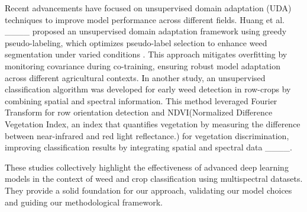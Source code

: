 \textcolor{black}Recent advancements have focused on unsupervised domain adaptation (UDA) techniques to improve model performance across different fields. Huang et al. ____ proposed an unsupervised domain adaptation framework using greedy pseudo-labeling, which optimizes pseudo-label selection to enhance weed segmentation under varied conditions . This approach mitigates overfitting by monitoring covariance during co-training, ensuring robust model adaptation across different agricultural contexts.
\textcolor{black}In another study, an unsupervised classification algorithm was developed for early weed detection in row-crops by combining spatial and spectral information. This method leveraged Fourier Transform for row orientation detection and NDVI(Normalized Difference Vegetation Index, an index that quantifies vegetation by measuring the difference between near-infrared and red light reflectance.) for vegetation discrimination, improving classification results by integrating spatial and spectral data ____.

\textcolor{black}These studies collectively highlight the effectiveness of advanced deep learning models in the context of weed and crop classification using multispectral datasets. They provide a solid foundation for our approach, validating our model choices and guiding our methodological framework.

\vspace{-1mm}